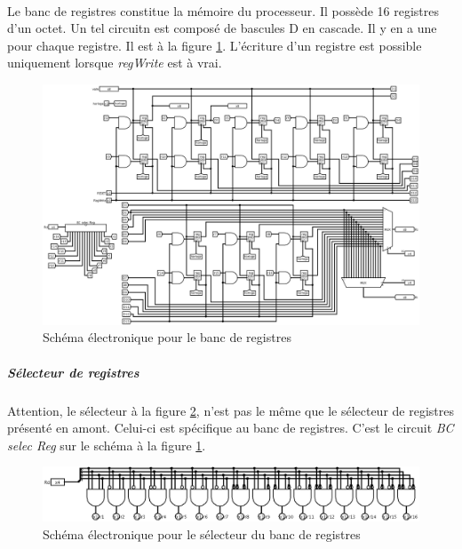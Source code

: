 \paragraph{}{
	Le banc de registres constitue la mémoire du processeur. Il possède
	16 registres d'un octet. Un tel circuitn 	est composé de bascules
	D en cascade. Il y en a une pour chaque registre. Il est à la figure
	\ref{banc_reg_circ}. \newline
	L'écriture d'un registre est possible uniquement lorsque \textit{regWrite}
	est à vrai.
}

\begin{figure}
	\centering
	\includegraphics[scale=0.4,angle=90,origin=c]{circuits/banc_reg.png}
	\caption{
		\label{banc_reg_circ}
		Sch\'{e}ma \'{e}lectronique pour le banc de registres
	}
\end{figure}

	\subparagraph{Sélecteur de registres}{
		Attention, le sélecteur à la figure \ref{banc_reg_selec_circ}, n'est
		pas le même que le sélecteur de registres présenté en amont.
		Celui-ci est spécifique au banc de registres. C'est le circuit
		\textit{BC selec Reg} sur le schéma à la figure \ref{banc_reg_circ}.
	}

\begin{figure}
	\centering
	\includegraphics[scale=0.3,origin=c]{circuits/banc_reg_selec.png}
	\caption{
		\label{banc_reg_selec_circ}
		Sch\'{e}ma \'{e}lectronique pour le sélecteur du banc de registres
	}
\end{figure}